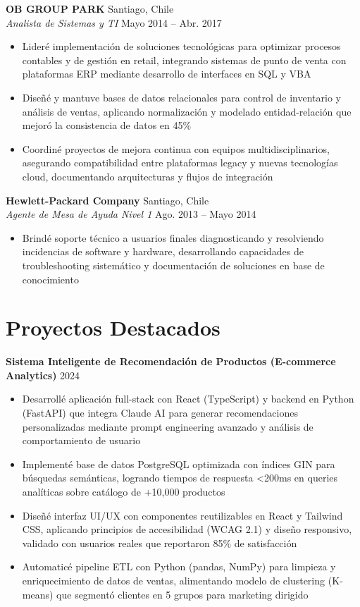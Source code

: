 \documentclass[11pt,letterpaper]{article}
\begin{document}
\vspace{2pt}
\textbf{OB GROUP PARK} \hfill Santiago, Chile\\
\textit{Analista de Sistemas y TI} \hfill Mayo 2014 – Abr. 2017
\begin{itemize}
  \item Lideré implementación de soluciones tecnológicas para optimizar procesos contables y de gestión en retail, integrando sistemas de punto de venta con plataformas ERP mediante desarrollo de interfaces en SQL y VBA
  \item Diseñé y mantuve bases de datos relacionales para control de inventario y análisis de ventas, aplicando normalización y modelado entidad-relación que mejoró la consistencia de datos en 45\%
  \item Coordiné proyectos de mejora continua con equipos multidisciplinarios, asegurando compatibilidad entre plataformas legacy y nuevas tecnologías cloud, documentando arquitecturas y flujos de integración
\end{itemize}
\vspace{2pt}
\textbf{Hewlett-Packard Company} \hfill Santiago, Chile\\
\textit{Agente de Mesa de Ayuda Nivel 1} \hfill Ago. 2013 – Mayo 2014
\begin{itemize}
  \item Brindé soporte técnico a usuarios finales diagnosticando y resolviendo incidencias de software y hardware, desarrollando capacidades de troubleshooting sistemático y documentación de soluciones en base de conocimiento
\end{itemize}

\section{Proyectos Destacados}

\textbf{Sistema Inteligente de Recomendación de Productos (E-commerce Analytics)} \hfill 2024
\begin{itemize}
  \item Desarrollé aplicación full-stack con React (TypeScript) y backend en Python (FastAPI) que integra Claude AI para generar recomendaciones personalizadas mediante prompt engineering avanzado y análisis de comportamiento de usuario
  \item Implementé base de datos PostgreSQL optimizada con índices GIN para búsquedas semánticas, logrando tiempos de respuesta <200ms en queries analíticas sobre catálogo de +10,000 productos
  \item Diseñé interfaz UI/UX con componentes reutilizables en React y Tailwind CSS, aplicando principios de accesibilidad (WCAG 2.1) y diseño responsivo, validado con usuarios reales que reportaron 85\% de satisfacción
  \item Automaticé pipeline ETL con Python (pandas, NumPy) para limpieza y enriquecimiento de datos de ventas, alimentando modelo de clustering (K-means) que segmentó clientes en 5 grupos para marketing dirigido
\end{itemize}
\end{document}
